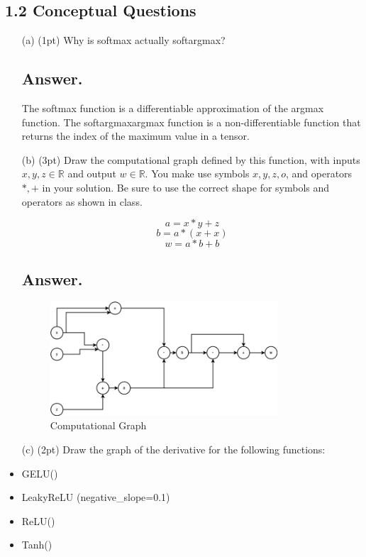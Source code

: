 \documentclass{article}
\begin{document}
\subsection*{1.2 Conceptual Questions}

\begin{itemize}
    \item[(a)] (1pt) Why is softmax actually softargmax?
 \subsection*{Answer.}
    The softmax function is a differentiable approximation of the argmax function. 
    The softargmaxargmax function is a non-differentiable function that returns the index of the maximum value in a tensor. 
    \item[(b)] (3pt) Draw the computational graph defined by this function, with inputs $x, y, z \in \mathbb{R}$ and output $w \in \mathbb{R}$. You make use symbols $x, y, z, o$, and operators $*, +$ in your solution. Be sure to use the correct shape for symbols and operators as shown in class.

\[ a = x * y + z \]
\[ b = a * (x + x) \]
\[ w = a * b + b \]
\subsection*{Answer.}
\begin{figure}[H]
    \centering
    \includegraphics[width=0.8\textwidth]{image.png}
    \caption{Computational Graph}
    \label{fig:computational_graph}
\end{figure}


    \item[(c)] (2pt) Draw the graph of the derivative for the following functions:

        \item GELU()
        \item LeakyReLU (negative\_slope=0.1)
        \item ReLU()
        \item Tanh()


\end{itemize}
\end{document}
